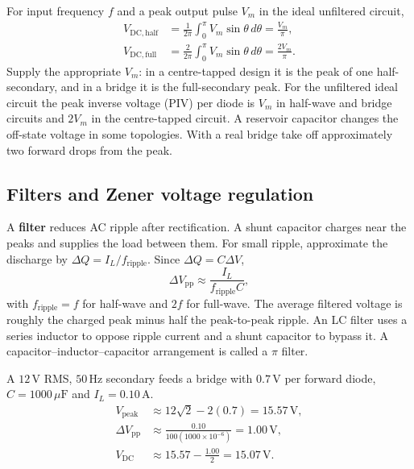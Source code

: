 \documentclass[12pt,a4paper]{article}
\begin{document}
For input frequency \(f\) and a peak output pulse \(V_m\) in the ideal unfiltered circuit,
\[
\begin{aligned}
V_{\mathrm{DC,half}}
 &=\frac{1}{2\pi}\int_0^\pi V_m\sin\theta\,d\theta
 =\frac{V_m}{\pi},\\
V_{\mathrm{DC,full}}
 &=\frac{2}{2\pi}\int_0^\pi V_m\sin\theta\,d\theta
 =\frac{2V_m}{\pi}.
\end{aligned}
\]
Supply the appropriate \(V_m\): in a centre-tapped design it is the peak of one half-secondary, and in a bridge it is the full-secondary peak. For the unfiltered ideal circuit the peak inverse voltage (PIV) per diode is \(V_m\) in half-wave and bridge circuits and \(2V_m\) in the centre-tapped circuit. A reservoir capacitor changes the off-state voltage in some topologies. With a real bridge take off approximately two forward drops from the peak.

\subsection{Filters and Zener voltage regulation}
A \textbf{filter} reduces AC ripple after rectification. A shunt capacitor charges near the peaks and supplies the load between them. For small ripple, approximate the discharge by \(\Delta Q=I_L/f_{\mathrm{ripple}}\). Since \(\Delta Q=C\Delta V\),
\[
\Delta V_{\mathrm{pp}}\approx\frac{I_L}{f_{\mathrm{ripple}}C},
\]
with \(f_{\mathrm{ripple}}=f\) for half-wave and \(2f\) for full-wave. The average filtered voltage is roughly the charged peak minus half the peak-to-peak ripple. An LC filter uses a series inductor to oppose ripple current and a shunt capacitor to bypass it. A capacitor--inductor--capacitor arrangement is called a \(\pi\) filter.

\begin{tcolorbox}[examplebox,title={Estimate the output from a filtered bridge}]
A \(12\,\mathrm{V}\) RMS, \(50\,\mathrm{Hz}\) secondary feeds a bridge with \(0.7\,\mathrm V\) per forward diode, \(C=1000\,\mu\mathrm F\) and \(I_L=0.10\,\mathrm A\).
\[
\begin{aligned}
V_{\mathrm{peak}}&\approx 12\sqrt2-2(0.7)=15.57\,\mathrm V,\\
\Delta V_{\mathrm{pp}}&\approx\frac{0.10}{100(1000\times10^{-6})}=1.00\,\mathrm V,\\
V_{\mathrm{DC}}&\approx15.57-\frac{1.00}{2}=15.07\,\mathrm V .
\end{aligned}
\]
\end{tcolorbox}
\end{document}
